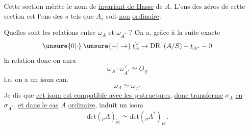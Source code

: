 Cette section mérite le nom de \uline{invariant de
Hasse} de $A$. L'ens des zéros de cette
section est  l'ens des $s$ tels que
$A_s$ soit \uline{non} \uline{ordinaire}.

Quelles sont les relations entre $\omega_A$ et $\omega_{A^*}$ ? On
a, grâce à la suite exacte
\[
\unsure{0|\cdot}\mathbin{\unsure{-|\to}}\underline t_A^\vee\to\mathrm{DR}^1(A/S)\mathbin{-}\underline t_{A^*}\mathbin{-}0
\]
la relation
donc on aura
\[
\omega_A\cdot\omega_{A^*}^\vee\simeq\underline O_S
\]
i.e. on a un isom can.
\[
\omega_A\simeq\omega_{A^*}
\]
Je dis que \uline{cet isom est compatible avec les
p-structures},  \uline{donc transforme} $\sigma_A$ \uline{en} $\sigma_{A^*}$, \uline{et
dans le cas} $A$ \uline{ordinaire}, induit un isom
\[
\operatorname{d\acute et}({}_pA)_{\mathrm{\acute et}}\simeq\operatorname{d\acute et}({}_p A^*)_{\mathrm{\acute et}} .
\]
